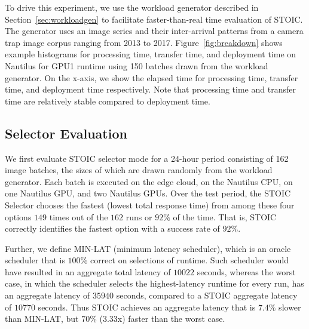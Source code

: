 To drive this experiment, we use the workload generator described in Section~\ref{sec:workloadgen} to facilitate faster-than-real time evaluation of STOIC. The generator uses an image series and their inter-arrival patterns from a camera trap image corpus ranging from 2013 to 2017. Figure~\ref{fig:breakdown} shows example histograms for processing time, transfer time, and deployment time on Nautilus for GPU1 runtime using 150 batches drawn from the workload generator. On the x-axis, we show the elapsed time for processing time, transfer time, and deployment time respectively. Note that processing time and transfer time are relatively stable compared to deployment time. 

\subsection{Selector Evaluation}

We first evaluate STOIC selector mode for a 24-hour period consisting of 162 image batches, the sizes of which are drawn randomly from the workload generator. Each batch is executed on the edge cloud, on the Nautilus CPU, on one Nautilus GPU, and two Nautilus GPUs. Over the test period, the STOIC Selector chooses the fastest (lowest total response time) from among these four options $149$ times out of the $162$ runs or $92\%$ of the time. That is, STOIC correctly identifies the fastest option with a success rate of $92\%$.

Further, we define MIN-LAT (minimum latency scheduler), which is an oracle scheduler that is $100\%$ correct on selections of runtime. Such scheduler would have resulted in an aggregate total latency of $10022$ seconds, whereas the worst case, in which the scheduler selects the highest-latency runtime for every run, has an aggregate latency of $35940$ seconds, compared to a STOIC aggregate latency of $10770$ seconds.  Thus STOIC achieves an aggregate latency that is $7.4\%$ slower than MIN-LAT, but $70\%$ ($3.33$x) faster than the worst case.


%

